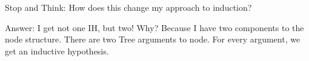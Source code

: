 \documentclass{lecturenotes}
\begin{document}
\vspace{0.2in}

\noindent Stop and Think: How does this change my approach to induction?

\noindent Answer: I get not one IH, but two! Why? Because I have two components to the node structure. 
There are two Tree arguments to node. For every argument, we get an inductive hypothesis. 

\vspace{0.2in}

\begin{center}
    \begin{code}%
%
\>[8]\AgdaSpace{}%
\AgdaSymbol{:}\AgdaSpace{}%
\AgdaSpace{}%
\AgdaSymbol{\{}\AgdaSpace{}%
\AgdaSymbol{:}\AgdaSpace{}%
\AgdaSymbol{\}}\AgdaSpace{}%
\AgdaSymbol{(}\AgdaSpace{}%
\AgdaSymbol{:}\AgdaSpace{}%
\AgdaSpace{}%
\AgdaSpace{}%
\AgdaSymbol{->}\AgdaSpace{}%
\AgdaSymbol{)}\AgdaSpace{}%
\AgdaSymbol{->}\<%
\\
\>[8][@{}l@{\AgdaIndent{0}}]%
\>[12]\AgdaSpace{}%
\AgdaSpace{}%
\AgdaSymbol{->}\<%
\\
%
\>[12]\AgdaSpace{}%
\AgdaSymbol{(}\AgdaSpace{}%
\AgdaSpace{}%
\AgdaSymbol{:}\AgdaSpace{}%
\AgdaSpace{}%
\AgdaSymbol{)}\AgdaSpace{}%
\AgdaSymbol{(}\AgdaSpace{}%
\AgdaSymbol{:}\AgdaSpace{}%
\AgdaSymbol{)}\AgdaSpace{}%
\AgdaSymbol{->}\AgdaSpace{}%
\AgdaSpace{}%
\AgdaSpace{}%
\AgdaSymbol{->}\AgdaSpace{}%
\AgdaSpace{}%
\AgdaSpace{}%
\AgdaSymbol{->}\AgdaSpace{}%
\AgdaSpace{}%
\AgdaSymbol{(}\AgdaSpace{}%
\AgdaSpace{}%
\AgdaSpace{}%
\AgdaSymbol{))}\AgdaSpace{}%
\AgdaSymbol{->}\<%
\\
%
\>[12]\AgdaSymbol{(}\AgdaSpace{}%
\AgdaSymbol{:}\AgdaSpace{}%
\AgdaSpace{}%
\AgdaSymbol{)}\AgdaSpace{}%
\AgdaSymbol{->}\AgdaSpace{}%
\AgdaSpace{}%
\<%
\\
%
\>[8]\AgdaSpace{}%
\AgdaSpace{}%
\AgdaSpace{}%
\AgdaSpace{}%
\AgdaSpace{}%
\AgdaSymbol{=}\AgdaSpace{}%
\<%
\\

\end{code}
\end{center}
\end{document}
